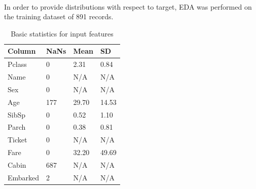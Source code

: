 \documentclass{article}
\begin{document}
\paragraph{}In order to provide distributions with respect to target, EDA was performed on the training dataset of 891 records.
\begin{table}[htb]
\centering
\begin{tabular}{|l|l|l|l|}
\hline
\textbf{Column} & \textbf{NaNs} & \textbf{Mean} & \textbf{SD} \\ \hline
Pclass          & 0             & 2.31          & 0.84         \\ \hline
Name            & 0             & N/A           & N/A          \\ \hline
Sex             & 0             & N/A           & N/A          \\ \hline
Age             & 177           & 29.70         & 14.53        \\ \hline
SibSp           & 0             & 0.52          & 1.10         \\ \hline
Parch           & 0             & 0.38          & 0.81         \\ \hline
Ticket          & 0             & N/A           & N/A          \\ \hline
Fare            & 0             & 32.20         & 49.69        \\ \hline
Cabin           & 687           & N/A           & N/A          \\ \hline
Embarked        & 2             & N/A           & N/A          \\ \hline
\end{tabular}
\caption{Basic statistics for input features}
\end{table}
\end{document}
